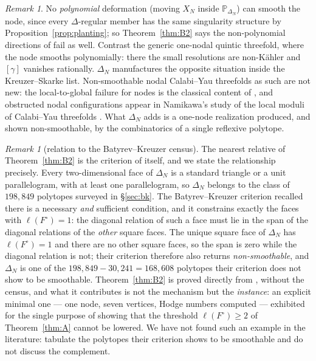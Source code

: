 \documentclass[11pt]{amsart}
\theoremstyle{definition}
\theoremstyle{remark}
\newtheorem{remark}[theorem]{Remark}
\newcommand{\PP}{\mathbb{P}}
\begin{document}
\begin{remark}\label{rem:nonpoly}
No \emph{polynomial} deformation (moving $X_N$ inside $\PP_{\Delta_N}$)
can smooth the node, since every $\Delta$-regular member has the same
singularity structure by Proposition~\ref{prop:planting}; so
Theorem~\ref{thm:B2} says the non-polynomial directions of \cite{Mav04}
fail as well.
Contrast the generic one-nodal quintic threefold, where the node smooths
polynomially: there the small resolutions are non-K\"ahler and
$[\gamma]$ vanishes rationally.  $\Delta_N$ manufactures the opposite
situation inside the Kreuzer--Skarke list.  Non-smoothable nodal
Calabi--Yau threefolds as such are not new: the local-to-global
failure for nodes is the classical content of \cite{Friedman86}, and
obstructed nodal configurations appear in Namikawa's study of the local
moduli of Calabi--Yau threefolds \cite{Namikawa02}.  What $\Delta_N$
adds is a one-node realization produced, and shown non-smoothable,
by the combinatorics of a single reflexive polytope.
\end{remark}

\begin{remark}[relation to the Batyrev--Kreuzer census]\label{rem:BKdecides}
The nearest relative of Theorem~\ref{thm:B2} is the criterion of
\cite{BK10} itself, and we state the relationship precisely.  Every
two-dimensional face of $\Delta_N$ is a standard triangle or a unit
parallelogram, with at least one parallelogram, so $\Delta_N$ belongs to
the class of $198{,}849$ polytopes surveyed in \S\ref{sec:bk}.  The
Batyrev--Kreuzer criterion recalled there is a necessary \emph{and}
sufficient condition, and it constrains exactly the faces with
$\ell(F^\circ)=1$: the diagonal relation of such a face must lie in the
span of the diagonal relations of the \emph{other} square faces.  The
unique square face of $\Delta_N$ has $\ell(F^\circ)=1$ and there are no
other square faces, so the span is zero while the diagonal relation is
not; their criterion therefore also returns \emph{non-smoothable}, and
$\Delta_N$ is one of the $198{,}849 - 30{,}241 = 168{,}608$ polytopes
their criterion does not show to be smoothable.  Theorem~\ref{thm:B2} is proved
directly from \cite{Friedman86}, without the census, and what it
contributes is not the mechanism but the \emph{instance}: an explicit
minimal one --- one node, seven vertices, Hodge numbers computed ---
exhibited for the single purpose of showing that the threshold
$\ell(F^\circ)\ge2$ of Theorem~\ref{thm:A} cannot be lowered.  We have not
found such an example in the literature: \cite{BK10} tabulate the polytopes
their criterion shows to be smoothable and do not discuss the complement.
\end{remark}
\end{document}
